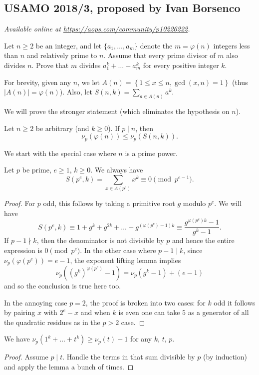 \documentclass[11pt]{scrartcl}
\begin{document}
\subsection{USAMO 2018/3, proposed by Ivan Borsenco}
\textsl{Available online at \url{https://aops.com/community/p10226222}.}
\begin{mdframed}[style=mdpurplebox,frametitle={Problem statement}]
Let $n \ge 2$ be an integer, and let $\{a_1, \dots, a_m\}$ denote
the $m = \varphi(n)$ integers less than $n$ and relatively prime to $n$.
Assume that every prime divisor of $m$ also divides $n$.
Prove that $m$ divides $a_1^k + \dots + a_m^k$ for every positive
integer $k$.
\end{mdframed}
For brevity, given any $n$,
we let $A(n) = \left\{ 1 \le x \le n, \gcd(x,n) = 1 \right\}$
(thus $|A(n)| = \varphi(n)$).
Also, let $S(n,k) = \sum_{a \in A(n)} a^k$.

We will prove the stronger statement
(which eliminates the hypothesis on $n$).
\begin{claim*}
  Let $n \ge 2$ be arbitrary (and $k \ge 0$).
  If $p \mid n$, then \[ \nu_p (\varphi(n)) \le \nu_p(S(n,k)). \]
\end{claim*}

We start with the special case where $n$ is a prime power.
\begin{lemma*}
  Let $p$ be prime, $e \ge 1$, $k \ge 0$.
  We always have
  \[ S(p^e, k) = \sum_{x \in A(p^e)} x^k \equiv 0 \pmod{p^{e-1}}.  \]
\end{lemma*}
\begin{proof}
  For $p$ odd, this follows by taking a primitive root $g$ modulo $p^{e}$.
  We will have
  \[ S(p^e, k) \equiv 1 + g^k + g^{2k} + \dots + g^{(\varphi(p^e)-1)k}
    \equiv \frac{g^{\varphi(p^e) k} - 1}{g^k - 1}. \]
  If $p-1 \nmid k$, then the denominator is not divisible by $p$
  and hence the entire expression is $0 \pmod{p^e}$.
  In the other case where $p-1 \mid k$,
  since $\nu_p(\varphi(p^e)) = e-1$,
  the exponent lifting lemma implies
  \[ \nu_p\left( (g^k)^{\varphi(p^e)} - 1 \right)
    = \nu_p(g^k-1) + (e-1) \]
  and so the conclusion is true here too.

  In the annoying case $p = 2$, the proof is broken into two cases:
  for $k$ odd it follows by pairing $x$ with $2^e-x$
  and when $k$ is even one can take $5$ as a generator
  of all the quadratic residues as in the $p > 2$ case.
\end{proof}
\begin{corollary*}
  We have $\nu_p(1^k + \dots + t^k) \ge \nu_p(t) - 1$ for any $k$,
  $t$, $p$.
\end{corollary*}
\begin{proof}
  Assume $p \mid t$.
  Handle the terms in that sum divisible by $p$ (by induction)
  and apply the lemma a bunch of times.
\end{proof}
\end{document}
